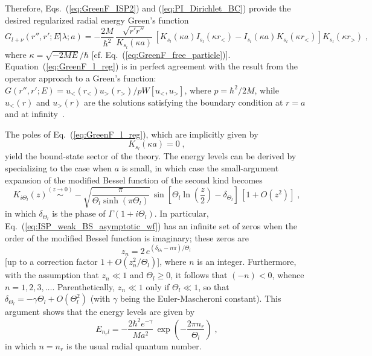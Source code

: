 \documentclass[a4paper,preprint,draft,showpacs,amsmath,amsfonts,amssymb,aps,prd]{revtex4}%
\begin{document}
Therefore,  
Eqs.~(\ref{eq:GreenF_ISP2}) and (\ref{eq:PI_Dirichlet_BC})
provide the desired regularized radial energy Green's function 
\begin{equation}
G_{l+\nu} 
\left(
\left. 
r'', r' ;  
E
\right| 
\lambda; a
\right)
=
 -  \frac{2M}{\hbar^{2}} \,
\frac{\sqrt{ r'r''}}{ K_{s_{l}}(\kappa a)}
\,
\left[
K_{s_{l}}(\kappa a) I_{s_{l}}(\kappa r_{<})
-
I_{s_{l}}(\kappa a) K_{s_{l}}(\kappa r_{<})
\right]
K_{s_{l}}(\kappa r_{>})
\;  ,
\label{eq:GreenF_l_reg}
\end{equation}
where $\kappa=
\sqrt{-2ME}/\hbar$ 
[cf. Eq.~(\ref{eq:GreenF_free_particle})].
Equation~(\ref{eq:GreenF_l_reg}) is in perfect agreement with
the result from 
the operator approach to a Green's function: 
$G(r'',r';E) = 
 u_{<} (r_{<}) u_{>} (r_{>})/ p W[u_{<},u_{>}]$,
where $p= \hbar^{2}/2M$, while $u_{<}(r)$ and $u_{>}(r)$ are
the solutions satisfying the boundary condition at $r=a$
and at infinity~\cite{Green_operator_approach}.

The poles of Eq.~(\ref{eq:GreenF_l_reg}), which 
are implicitly given by
\begin{equation}
K_{s_{l}} (\kappa a) = 0
\;  ,
\label{eq:reg_eigenvalue_eq}
\end{equation}
yield the bound-state sector of the theory.
The energy levels
can be derived by specializing to the case when $a$ is small, 
in which case the small-argument expansion of the modified Bessel function
of the second kind becomes~\cite{cam:00,abr:72}
\begin{equation}
K_{i\Theta_{l}} (z) 
  \stackrel{(z \rightarrow 0)}{\sim}
-
\sqrt{ \frac{\pi}{ \Theta_{l} 
\sinh  \left( \pi \Theta_{l} \right) } }
\,
\sin
\left[
\Theta_{l} \ln \left( \frac{ z }{2} \right) 
- \delta_{\Theta_{l}}
\right]
\,
\left[ 1 + O \left( z^{2} \right)  \right] 
\;  ,
\label{eq:ISP_weak_BS_asymptotic_wf}
\end{equation}
in which
$ \delta_{\Theta_{l}} $ is the phase of
$\Gamma (1+i\Theta_{l})$.
In particular,
Eq.~(\ref{eq:ISP_weak_BS_asymptotic_wf})
has an infinite set of zeros when the order of the 
 modified Bessel function is imaginary; these zeros
are
\begin{equation}
z_{n} = 2 \,
e^{ (\delta_{\Theta_{l}} - n \pi)/\Theta_{l} }
\, 
\end{equation}
[up to a correction factor  $1 + O(z_{n}^{2}/\Theta_{l} )$],
where $n$ is an integer. Furthermore,
with the assumption that $z_{n} \ll 1$ and
$\Theta_{l} \geq 0$,  it follows that $(-n)<0$,
whence  $n= 1, 2, 3, \ldots$.
Parenthetically, $z_{n} \ll 1$ only if $\Theta_{l} \ll 1$, so that
$\delta_{\Theta_{l}}=- \gamma \Theta_{l}+ O(\Theta_{l}^{2})$
(with $\gamma$ being the Euler-Mascheroni constant).
This argument shows that
the
energy levels are given by
\begin{equation}
E_{ n_{r} l }
=
-
\frac{2 \hbar^{2} e^{-\gamma}}{M a^{2} }
\,
\exp 
\left( 
- \frac{2 \pi n_{r} }{ \Theta_{l} } 
\right)
\; ,
\end{equation}
in which 
$n=n_{r}$ is the usual radial quantum number.
\end{document}
